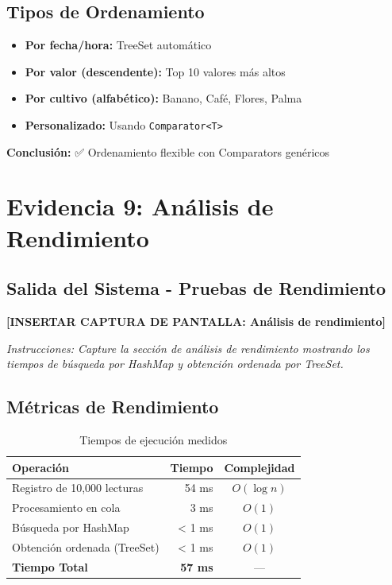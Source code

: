 \documentclass[12pt,a4paper]{article}
\begin{document}
\subsection{Tipos de Ordenamiento}

\begin{itemize}
    \item \textbf{Por fecha/hora:} TreeSet automático
    \item \textbf{Por valor (descendente):} Top 10 valores más altos
    \item \textbf{Por cultivo (alfabético):} Banano, Café, Flores, Palma
    \item \textbf{Personalizado:} Usando \texttt{Comparator<T>}
\end{itemize}

\textbf{Conclusión:} ✅ Ordenamiento flexible con Comparators genéricos


\section{Evidencia 9: Análisis de Rendimiento}

\subsection{Salida del Sistema - Pruebas de Rendimiento}

\begin{tcolorbox}[colback=green!5,colframe=green!75!black,title=\textbf{ANÁLISIS DE RENDIMIENTO}]
\vspace{0.5cm}
\textbf{[INSERTAR CAPTURA DE PANTALLA: Análisis de rendimiento]}

\textit{Instrucciones: Capture la sección de análisis de rendimiento mostrando los tiempos de búsqueda por HashMap y obtención ordenada por TreeSet.}
\vspace{0.5cm}
\end{tcolorbox}

\subsection{Métricas de Rendimiento}

\begin{table}[h]
\centering
\begin{tabular}{|l|r|c|}
\hline
\rowcolor{agrogreen!20}
\textbf{Operación} & \textbf{Tiempo} & \textbf{Complejidad} \\
\hline
Registro de 10,000 lecturas & 54 ms & $O(\log n)$ \\
Procesamiento en cola & 3 ms & $O(1)$ \\
Búsqueda por HashMap & < 1 ms & $O(1)$ \\
Obtención ordenada (TreeSet) & < 1 ms & $O(1)$ \\
\hline
\textbf{Tiempo Total} & \textbf{57 ms} & --- \\
\hline
\end{tabular}
\caption{Tiempos de ejecución medidos}
\label{tab:rendimiento}
\end{table}
\end{document}
